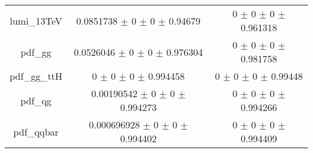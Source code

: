 \begin{table}
\begin{tabular}{ccc}
lumi\_13TeV & \num{0.0851738} $\pm$ \num{0} $\pm$ \num{0} $\pm$ \num{0.94679} & \num{0} $\pm$ \num{0} $\pm$ \num{0} $\pm$ \num{0.961318}\\
pdf\_gg & \num{0.0526046} $\pm$ \num{0} $\pm$ \num{0} $\pm$ \num{0.976304} & \num{0} $\pm$ \num{0} $\pm$ \num{0} $\pm$ \num{0.981758}\\
pdf\_gg\_ttH & \num{0} $\pm$ \num{0} $\pm$ \num{0} $\pm$ \num{0.994458} & \num{0} $\pm$ \num{0} $\pm$ \num{0} $\pm$ \num{0.99448}\\
pdf\_qg & \num{0.00190542} $\pm$ \num{0} $\pm$ \num{0} $\pm$ \num{0.994273} & \num{0} $\pm$ \num{0} $\pm$ \num{0} $\pm$ \num{0.994266}\\
pdf\_qqbar & \num{0.000696928} $\pm$ \num{0} $\pm$ \num{0} $\pm$ \num{0.994402} & \num{0} $\pm$ \num{0} $\pm$ \num{0} $\pm$ \num{0.994409}\\
\bottomrule
\end{tabular}
\end{table}
